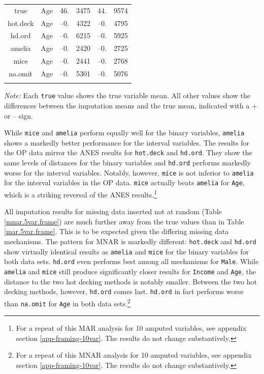 \documentclass[12pt,econ]{sources/authesis}
\begin{document}
\begin{table}[H]
\begin{threeparttable}
\begin{tabular}{ccr@{}lr@{}l}
 true & Age & 46.&3475 & 44.&9574 \\ 
 hot.deck & Age & --0.&4322 & --0.&4795 \\
 hd.ord & Age & --0.&6215 & --0.&5925 \\
 amelia & Age & --0.&2420 & --0.&2725 \\ 
 mice & Age & --0.&2441 & --0.&2768 \\ 
 na.omit & Age & --0.&5301 & --0.&5076 \\
 \hline \\[-1.8ex] 
\end{tabular} 
\begin{tablenotes}
\footnotesize{\textit{Note:} Each \texttt{true} value shows the true variable mean. All other values show the differences between the imputation means and the true mean, indicated with a + or -- sign.}
\end{tablenotes}
\end{threeparttable}
\end{table}
\dsp

While \texttt{mice} and \texttt{amelia} perform equally well for the binary variables, \texttt{amelia} shows a markedly better performance for the interval variables. The results for the OP data mirror the ANES results for \texttt{hot.deck} and \texttt{hd.ord}. They show the same levels of distances for the binary variables and \texttt{hd.ord} performs markedly worse for the interval variables. Notably, however, \texttt{mice} is not inferior to \texttt{amelia} for the interval variables in the OP data. \texttt{mice} actually beats \texttt{amelia} for \texttt{Age}, which is a striking reversal of the ANES results.\footnote{For a repeat of this MAR analysis for 10 amputed variables, see appendix section \ref{app-framing-10var}. The results do not change substantively.}

All imputation results for missing data inserted not at random (Table \ref{mnar.5var.frame}) are much further away from the true values than in Table \ref{mar.5var.frame}. This is to be expected given the differing missing data mechanisms. The pattern for MNAR is markedly different: \texttt{hot.deck} and \texttt{hd.ord} show virtually identical results as \texttt{amelia} and \texttt{mice} for the binary variables for both data sets. \texttt{hd.ord} even performs best among all mechanisms for \texttt{Male}. While \texttt{amelia} and \texttt{mice} still produce significantly closer results for \texttt{Income} and \texttt{Age}, the distance to the two hot decking methods is notably smaller. Between the two hot decking methods, however, \texttt{hd.ord} comes last. \texttt{hd.ord} in fact performs worse than \texttt{na.omit} for \texttt{Age} in both data sets.\footnote{For a repeat of this MNAR analysis for 10 amputed variables, see appendix section \ref{app-framing-10var}. The results do not change substantively.}
\end{document}
